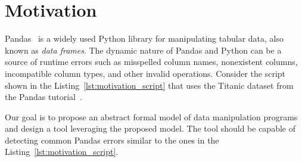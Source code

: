 \section{Motivation}

Pandas~\cite{pandas_docs} is a widely used Python library for manipulating tabular data,
also known as \emph{data frames}.
The dynamic nature of Pandas and Python can be a source of runtime errors such as misspelled column names, nonexistent
columns, incompatible column types, and other invalid operations.
Consider the script shown in the Listing~\ref{lst:motivation_script}
that uses the Titanic dataset from the Pandas tutorial~\cite{pandas_statistics_2020}.




Our goal is to propose an abstract formal model of data manipulation programs
and design a tool leveraging the proposed model.
The tool should be capable of detecting common Pandas errors similar to the ones in the Listing~\ref{lst:motivation_script}.

